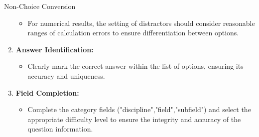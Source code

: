 \begin{methodbox}{Non-Choice Conversion}
\begin{enumerate}
\begin{itemize}
        \item For numerical results, the setting of distractors should consider reasonable ranges of calculation errors to ensure differentiation between options.
    \end{itemize}
    \item \textbf{Answer Identification:}
    \begin{itemize}
        \item Clearly mark the correct answer within the list of options, ensuring its accuracy and uniqueness.
    \end{itemize}
    \item \textbf{Field Completion:}
    \begin{itemize}
        \item Complete the category fields ("discipline","field","subfield") and select the appropriate difficulty level to ensure the integrity and accuracy of the question information.
    \end{itemize}
\end{enumerate}
\end{methodbox}
